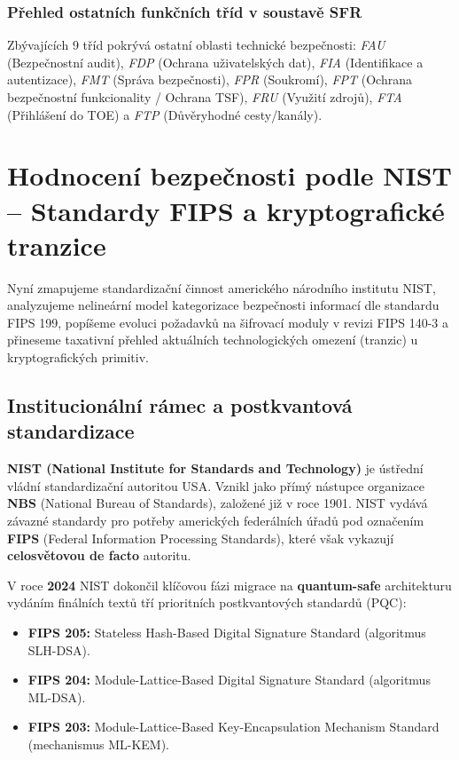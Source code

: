 \documentclass[10pt,a4paper]{article}
\begin{document}
	\subsubsection*{Přehled ostatních funkčních tříd v soustavě SFR}
	Zbývajících 9 tříd pokrývá ostatní oblasti technické bezpečnosti: \textit{FAU} (Bezpečnostní audit), \textit{FDP} (Ochrana uživatelských dat), \textit{FIA} (Identifikace a autentizace), \textit{FMT} (Správa bezpečnosti), \textit{FPR} (Soukromí), \textit{FPT} (Ochrana bezpečnostní funkcionality / Ochrana TSF), \textit{FRU} (Využití zdrojů), \textit{FTA} (Přihlášení do TOE) a \textit{FTP} (Důvěryhodné cesty/kanály).
	
	\section{Hodnocení bezpečnosti podle NIST -- Standardy FIPS a kryptografické tranzice}
	
	Nyní zmapujeme standardizační činnost amerického národního institutu NIST, analyzujeme nelineární model kategorizace bezpečnosti informací dle standardu FIPS 199, popíšeme evoluci požadavků na šifrovací moduly v revizi FIPS 140-3 a přineseme taxativní přehled aktuálních technologických omezení (tranzic) u kryptografických primitiv.
	
	\subsection{Institucionální rámec a postkvantová standardizace}
	\textbf{NIST (National Institute for Standards and Technology)} je ústřední vládní standardizační autoritou USA. Vznikl jako přímý nástupce organizace \textbf{NBS} (National Bureau of Standards), založené již v roce 1901. NIST vydává závazné standardy pro potřeby amerických federálních úřadů pod označením \textbf{FIPS} (Federal Information Processing Standards), které však vykazují \textbf{celosvětovou de facto} autoritu.
	
	V roce \textbf{2024} NIST dokončil klíčovou fázi migrace na \textbf{quantum-safe} architekturu vydáním finálních textů tří prioritních postkvantových standardů (PQC):
	\begin{itemize}
		\item \textbf{FIPS 205:} Stateless Hash-Based Digital Signature Standard (algoritmus SLH-DSA).
		\item \textbf{FIPS 204:} Module-Lattice-Based Digital Signature Standard (algoritmus ML-DSA).
		\item \textbf{FIPS 203:} Module-Lattice-Based Key-Encapsulation Mechanism Standard (mechanismus ML-KEM).
	\end{itemize}
	
\end{document}

